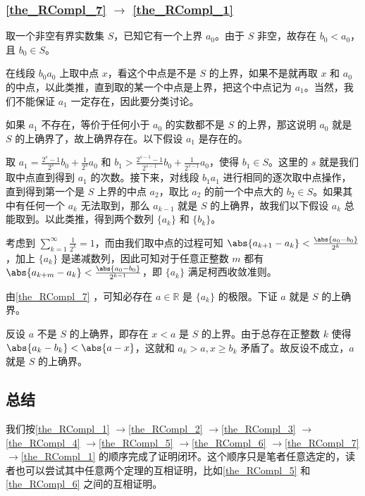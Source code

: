 \subsubsection{\autoref{the_RCompl_7} $\to$ \autoref{the_RCompl_1} }

取一个非空有界实数集 $S$，已知它有一个上界 $a_0$。由于 $S$ 非空，故存在 $b_0<a_0$，且 $b_0\in S$。

在线段 $b_0a_0$ 上取中点 $x$，看这个中点是不是 $S$ 的上界，如果不是就再取 $x$ 和 $a_0$ 的中点，以此类推，直到取的某一个中点是上界，把这个中点记为 $a_1$。当然，我们不能保证 $a_1$ 一定存在，因此要分类讨论。

如果 $a_1$ 不存在，等价于任何小于 $a_0$ 的实数都不是 $S$ 的上界，那这说明 $a_0$ 就是 $S$ 的上确界了，故上确界存在。以下假设 $a_1$ 是存在的。


取 $a_1=\frac{2^{s}-1}{2^{s}}b_0+\frac{1}{2^{s}}a_0$ 和 $b_1>\frac{2^{{s}-1}-1}{2^{{s}-1}}b_0+\frac{1}{2^{{s}-1}}a_0$，使得 $b_1\in S$。这里的 $s$ 就是我们取中点直到得到 $a_1$ 的次数。接下来，对线段 $b_1a_1$ 进行相同的逐次取中点操作，直到得到第一个是 $S$ 上界的中点 $a_2$，取比 $a_2$ 的前一个中点大的 $b_2\in S$。如果其中有任何一个 $a_k$ 无法取到，那么 $a_{k-1}$ 就是 $S$ 的上确界，故我们以下假设 $a_k$ 总能取到。以此类推，得到两个数列 $\{a_k\}$ 和 $\{b_k\}$。

考虑到 $\sum\limits_{k=1}^\infty \frac{1}{2^k}=1$，而由我们取中点的过程可知 $\abs{a_{k+1}-a_k}<\frac{\abs{a_0-b_0}}{2^k}$，加上 $\{a_k\}$ 是递减数列，因此可知对于任意正整数 $m$ 都有 $\abs{a_{k+m}-a_k}<\frac{\abs{a_0-b_0}}{2^{k-1}}$，即 $\{a_k\}$ 满足柯西收敛准则。

由\autoref{the_RCompl_7} ，可知必存在 $a\in\mathbb{R}$ 是 $\{a_k\}$ 的极限。下证 $a$ 就是 $S$ 的上确界。

反设 $a$ 不是 $S$ 的上确界，即存在 $x<a$ 是 $S$ 的上界。由于总存在正整数 $k$ 使得 $\abs{a_k-b_k}<\abs{a-x}$，这就和 $a_k>a, x\geq b_k$ 矛盾了。故反设不成立，$a$ 就是 $S$ 的上确界。

\subsection{总结}

我们按\autoref{the_RCompl_1} $\to$\autoref{the_RCompl_2} $\to$\autoref{the_RCompl_3} $\to$\autoref{the_RCompl_4} $\to$\autoref{the_RCompl_5} $\to$\autoref{the_RCompl_6} $\to$\autoref{the_RCompl_7} $\to$\autoref{the_RCompl_1} 的顺序完成了证明闭环。这个顺序只是笔者任意选定的，读者也可以尝试其中任意两个定理的互相证明，比如\autoref{the_RCompl_5} 和\autoref{the_RCompl_6} 之间的互相证明。

